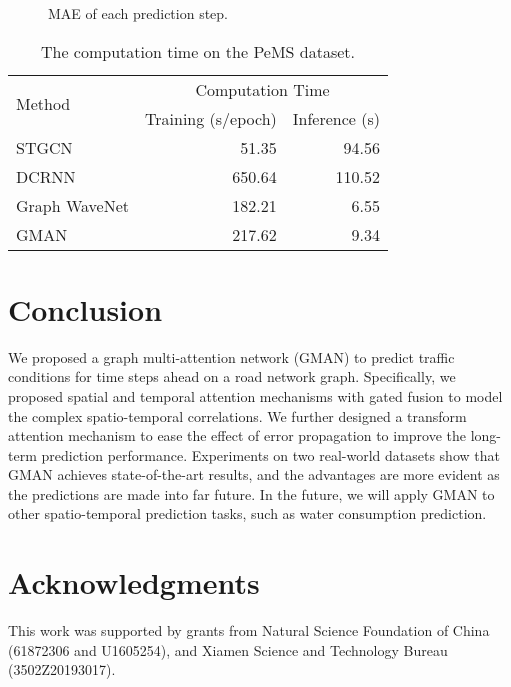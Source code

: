 \documentclass[letterpaper]{article} \usepackage{aaai20}  \usepackage{times}  \usepackage{helvet} \usepackage{courier}  \usepackage[hyphens]{url}  \usepackage{graphicx} \usepackage{amsmath}
\begin{document}
\begin{figure}
	\centering
	\caption{MAE of each prediction step.}
	\label{Figure9} 
\end{figure}

\begin{table}
	\centering
	\begin{tabular*}{\hsize}{@{}@{\extracolsep{\fill}}lrr@{}}
		\toprule
		\multirow{2}{*}{Method}		& \multicolumn{2}{c}{Computation Time}		\\
		& Training (s/epoch)	& Inference (s)		\\
		\midrule
		STGCN						& 51.35					& 94.56 			\\
		DCRNN						& 650.64				& 110.52			\\
		Graph WaveNet				& 182.21				& 6.55				\\
		GMAN                        & 217.62                & 9.34              \\
		\bottomrule
	\end{tabular*}
	\caption{The computation time on the PeMS dataset.}
	\label{Table2}
\end{table}

\section{Conclusion}

We proposed a graph multi-attention network (GMAN) to predict traffic conditions for time steps ahead on a road network graph. Specifically, we proposed spatial and temporal attention mechanisms with gated fusion to model the complex spatio-temporal correlations. We further designed a transform attention mechanism to ease the effect of error propagation to improve the long-term prediction performance. Experiments on two real-world datasets show that GMAN achieves state-of-the-art results, and the advantages are more evident as the predictions are made into far future. In the future, we will apply GMAN to other spatio-temporal prediction tasks, such as water consumption prediction. 

\section{Acknowledgments}

This work was supported by grants from Natural Science Foundation of China (61872306 and U1605254), and Xiamen Science and Technology Bureau (3502Z20193017).



\end{document}
